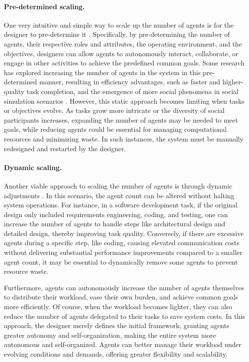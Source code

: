 \paragraph{Pre-determined scaling.}
One very intuitive and simple way to scale up the number of agents is for the designer to pre-determine it  \cite{DBLP:journals/corr/abs-2303-17760, DBLP:journals/corr/abs-2305-11595}. Specifically, by pre-determining the number of agents, their respective roles and attributes, the operating environment, and the objectives, designers can allow agents to autonomously interact, collaborate, or engage in other activities to achieve the predefined common goals.
Some research has explored increasing the number of agents in the system in this pre-determined manner, resulting in efficiency advantages, such as faster and higher-quality task completion, and the emergence of more social phenomena in social simulation scenarios \cite{DBLP:journals/corr/abs-2304-03442,DBLP:journals/corr/abs-2308-10848}. 
However, this static approach becomes limiting when tasks or objectives evolve. As tasks grow more intricate or the diversity of social participants increases, expanding the number of agents may be needed to meet goals, while reducing agents could be essential for managing computational resources and minimizing waste. In such instances, the system must be manually redesigned and restarted by the designer.

\paragraph{Dynamic scaling.}
Another viable approach to scaling the number of agents is through dynamic adjustments \cite{DBLP:journals/corr/abs-2306-03314,DBLP:journals/corr/abs-2308-10848}. In this scenario, the agent count can be altered without halting system operations. For instance, in a software development task, if the original design only included requirements engineering, coding, and testing, one can increase the number of agents to handle steps like architectural design and detailed design, thereby improving task quality. 
Conversely, if there are excessive agents during a specific step, like coding, causing elevated communication costs without delivering substantial performance improvements compared to a smaller agent count, it may be essential to dynamically remove some agents to prevent resource waste.

Furthermore, agents can autonomously increase the number of agents \cite{DBLP:journals/corr/abs-2306-03314} themselves to distribute their workload, ease their own burden, and achieve common goals more efficiently. Of course, when the workload becomes lighter, they can also reduce the number of agents delegated to their tasks to save system costs. In this approach, the designer merely defines the initial framework, granting agents greater autonomy and self-organization, making the entire system more autonomous and self-organized. Agents can better manage their workload under evolving conditions and demands, offering greater flexibility and scalability.

